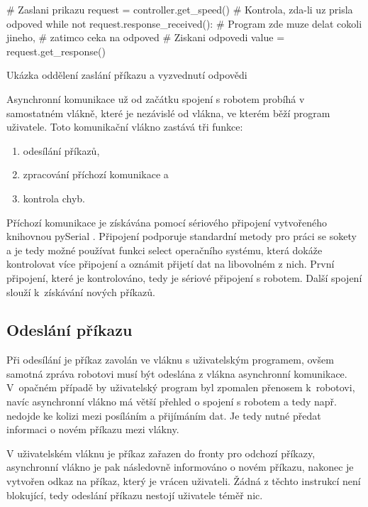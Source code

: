    \begin{listing}[H]
    \begin{pyc}
# Zaslani prikazu
request = controller.get_speed()
# Kontrola, zda-li uz prisla odpoved
while not request.response_received():
    # Program zde muze delat cokoli jineho,
    # zatimco ceka na odpoved
# Ziskani odpovedi
value = request.get_response()
    \end{pyc}
    \caption{Ukázka oddělení zaslání příkazu a vyzvednutí odpovědi}
    \label{lst:oddeleni}
    \end{listing}

    Asynchronní komunikace už od začátku spojení s robotem probíhá v
    samostatném vlákně, které je nezávislé od vlákna, ve kterém běží program
    uživatele. Toto komunikační vlákno zastává tři funkce:

    \begin{enumerate}
        \item odesílání příkazů,
        \item zpracování příchozí komunikace a
        \item kontrola chyb.
    \end{enumerate}

    Příchozí komunikace je získávána pomocí sériového připojení vytvořeného
    knihovnou pySerial \cite{pyserial}. Připojení podporuje standardní metody
    pro práci se sokety a je tedy možné používat funkci select operačního
    systému, která dokáže kontrolovat více připojení a oznámit přijetí dat na
    libovolném z nich. První připojení, které je kontrolováno, tedy je sériové
    připojení s robotem. Další spojení slouží k~získávání nových příkazů.

    \subsection{Odeslání příkazu}

    Při odesílání je příkaz zavolán ve vláknu s uživatelským programem, ovšem
    samotná zpráva robotovi musí být odeslána z vlákna asynchronní komunikace.
    V~opačném případě by uživatelský program byl zpomalen přenosem k~robotovi,
    navíc asynchronní vlákno má větší přehled o spojení s robotem a tedy např.
    nedojde ke kolizi mezi posíláním a přijímáním dat. Je tedy nutné předat
    informaci o novém příkazu mezi vlákny.

    V uživatelském vláknu je příkaz zařazen do fronty pro odchozí příkazy,
    asynchronní vlákno je pak následovně informováno o novém příkazu, nakonec
    je vytvořen odkaz na příkaz, který je vrácen uživateli. Žádná z těchto
    instrukcí není blokující, tedy odeslání příkazu nestojí uživatele téměř
    nic.

